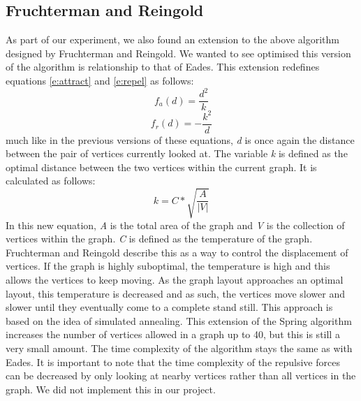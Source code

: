 \documentclass[a4paper,12pt,twoside]{article}
\begin{document}
\subsection{Fruchterman and Reingold}
As part of our experiment, we also found an extension to the above algorithm designed by Fruchterman and Reingold\cite{FandR}. We wanted to see optimised this version of the algorithm is relationship to that of Eades. This extension redefines equations \ref{e:attract} and \ref{e:repel} as follows:
\begin{equation}\label{e:FRattract}
f_a(d)=\frac{d^2}{k}
\end{equation}
\begin{equation}\label{e:FRrepel}
f_r(d)=-\frac{k^2}{d}
\end{equation}
much like in the previous versions of these equations, \emph{d} is once again the distance between the pair of vertices currently looked at. The variable \emph{k} is defined as the optimal distance between the two vertices within the current graph. It is calculated as follows:
\begin{equation}\label{e:optimalD}
k=C*\sqrt{\frac{A}{|V|}}
\end{equation}
In this new equation, \emph{A} is the total area of the graph and \emph{V} is the collection of vertices within the graph. \emph{C} is defined as the temperature of the graph. Fruchterman and Reingold describe this as a way to control the displacement of vertices. If the graph is highly suboptimal, the temperature is high and this allows the vertices to keep moving. As the graph layout approaches an optimal layout, this temperature is decreased and as such, the vertices move slower and slower until they eventually come to a complete stand still. This approach is based on the idea of simulated annealing.
\newline
This extension of the Spring algorithm increases the number of vertices allowed in a graph up to 40, but this is still a very small amount. The time complexity of the algorithm stays the same as with Eades. It is important to note that the time complexity of the repulsive forces can be decreased by only looking at nearby vertices rather than all vertices in the graph. We did not implement this in our project.
\end{document}
